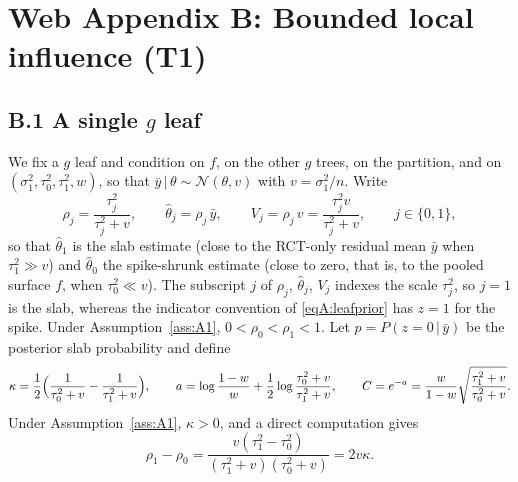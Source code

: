 \documentclass[11pt]{article}
\newcommand{\Normal}{\mathcal{N}}
\newcommand{\given}{\,\vert\,}
\theoremstyle{definition}
\theoremstyle{plain}
\begin{document}
{\section*{Web Appendix B: Bounded local influence (T1)}

\subsection*{B.1 A single $g$ leaf}

We fix a $g$ leaf and condition on $f$, on the other $g$ trees, on the partition, and on $(\sigma_1^2,\tau_0^2,\tau_1^2,w)$, so that $\bar y\given\theta\sim\Normal(\theta,v)$ with $v=\sigma_1^2/n$. Write
\begin{equation}
\rho_j=\frac{\tau_j^2}{\tau_j^2+v},\qquad \hat\theta_j=\rho_j\,\bar y,\qquad V_j=\rho_j\,v=\frac{\tau_j^2v}{\tau_j^2+v},\qquad j\in\{0,1\},
\label{eq:rho}
\end{equation}
so that $\hat\theta_1$ is the slab estimate (close to the RCT-only residual mean $\bar y$ when $\tau_1^2\gg v$) and $\hat\theta_0$ the spike-shrunk estimate (close to zero, that is, to the pooled surface $f$, when $\tau_0^2\ll v$). The subscript $j$ of $\rho_j$, $\hat\theta_j$, $V_j$ indexes the scale $\tau_j^2$, so $j=1$ is the slab, whereas the indicator convention of \eqref{eqA:leafprior} has $z=1$ for the spike. Under Assumption~\ref{ass:A1}, $0<\rho_0<\rho_1<1$. Let $p=P(z=0\given\bar y)$ be the posterior slab probability and define
\begin{equation}
\kappa=\frac{1}{2}\Bigl(\frac{1}{\tau_0^2+v}-\frac{1}{\tau_1^2+v}\Bigr),\qquad
a=\log\frac{1-w}{w}+\frac{1}{2}\log\frac{\tau_0^2+v}{\tau_1^2+v},\qquad
C=e^{-a}=\frac{w}{1-w}\sqrt{\frac{\tau_1^2+v}{\tau_0^2+v}}.
\label{eq:kappaC}
\end{equation}
Under Assumption~\ref{ass:A1}, $\kappa>0$, and a direct computation gives
\begin{equation}
\rho_1-\rho_0=\frac{v(\tau_1^2-\tau_0^2)}{(\tau_1^2+v)(\tau_0^2+v)}=2v\kappa .
\label{eq:rhodiff}
\end{equation}

}
\end{document}
